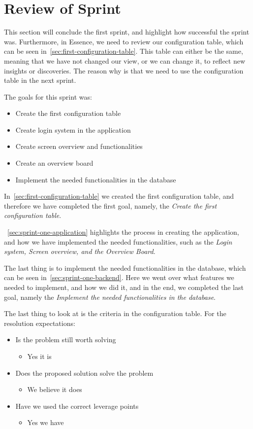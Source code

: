 \section{Review of Sprint}\label{sec:review-sprint-anne}
This section will conclude the first sprint, and highlight how successful the sprint was.
Furthermore, in Essence, we need to review our configuration table, which can be seen in~\autoref{sec:first-configuration-table}.
This table can either be the same, meaning that we have not changed our view, or we can change it, to reflect new insights or discoveries.
The reason why is that we need to use the configuration table in the next sprint.

The goals for this sprint was:

\begin{itemize}
    \item Create the first configuration table 
    \item Create login system in the application
    \item Create screen overview and functionalities
    \item Create an overview board
    \item Implement the needed functionalities in the database
\end{itemize}

In~\autoref{sec:first-configuration-table} we created the first configuration table, and therefore we have completed the first goal, namely, the \textit{Create the first configuration table}.

~\autoref{sec:sprint-one-application} highlights the process in creating the application, and how we have implemented the needed functionalities, such as the \textit{Login system, Screen overview, and the Overview Board}.

The last thing is to implement the needed functionalities in the database, which can be seen in~\autoref{sec:sprint-one-backend}.
Here we went over what features we needed to implement, and how we did it, and in the end, we completed the last goal, namely the \textit{Implement the needed functionalities in the database}.

The last thing to look at is the criteria in the configuration table.
For the resolution expectations:

\begin{itemize}
    \item Is the problem still worth solving
    \begin{itemize}
        \item Yes it is
    \end{itemize}
    \item Does the proposed solution solve the problem
    \begin{itemize}
        \item We believe it does
    \end{itemize}
    \item Have we used the correct leverage points
    \begin{itemize}
        \item Yes we have
    \end{itemize}
\end{itemize}

